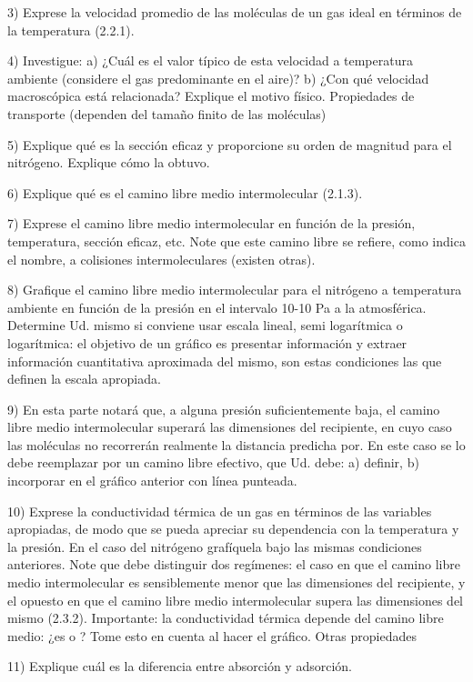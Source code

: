 \documentclass[letterpaper,11pt]{article}
\begin{document}
3) Exprese la velocidad promedio de las moléculas de un gas ideal en términos de la
temperatura (2.2.1).

4) Investigue:
a) ¿Cuál es el valor típico de esta velocidad a temperatura ambiente (considere
el gas predominante en el aire)?
b) ¿Con qué velocidad macroscópica está relacionada? Explique el motivo
físico.
Propiedades de transporte (dependen del tamaño finito de las moléculas)

5) Explique qué es la sección eficaz y proporcione su orden de magnitud para el
nitrógeno. Explique cómo la obtuvo.

6) Explique qué es el camino libre medio intermolecular (2.1.3).

7) Exprese el camino libre medio intermolecular en función de la presión, temperatura,
sección eficaz, etc. Note que este camino libre se refiere, como indica el nombre,
a colisiones intermoleculares (existen otras).

8) Grafique el camino libre medio intermolecular para el nitrógeno a temperatura
ambiente en función de la presión en el intervalo 10-10 Pa a la atmosférica.
Determine Ud. mismo si conviene usar escala lineal, semi logarítmica o logarítmica:
el objetivo de un gráfico es presentar información y extraer información cuantitativa
aproximada del mismo, son estas condiciones las que definen la escala apropiada.

9) En esta parte notará que, a alguna presión suficientemente baja, el camino libre
medio intermolecular superará las dimensiones del recipiente, en cuyo caso las
moléculas no recorrerán realmente la distancia predicha por. En este caso se lo
debe reemplazar por un camino libre efectivo, que Ud. debe:
a) definir,
b) incorporar en el gráfico anterior con línea punteada.

10) Exprese la conductividad térmica de un gas en términos de las variables apropiadas,
de modo que se pueda apreciar su dependencia con la temperatura y la presión. En
el caso del nitrógeno grafíquela bajo las mismas condiciones anteriores. Note que
debe distinguir dos regímenes: el caso en que el camino libre medio intermolecular
es sensiblemente menor que las dimensiones del recipiente, y el opuesto en que el
camino libre medio intermolecular supera las dimensiones del mismo (2.3.2).
Importante: la conductividad térmica depende del camino libre medio: ¿es o ?
Tome esto en cuenta al hacer el gráfico.
Otras propiedades

11) Explique cuál es la diferencia entre absorción y adsorción.
\end{document}
